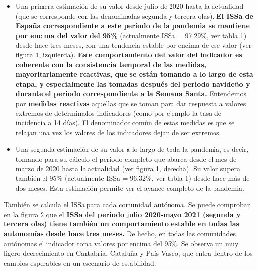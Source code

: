 \documentclass[
  11pt,
]{article}
\begin{document}
\begin{itemize}
\item
  Una primera estimación de su valor desde julio de 2020 hasta la
  actualidad (que se corresponde con las denominadas segunda y tercera
  olas). \textbf{El ISSa de España correspondiente a este periodo de la
  pandemia se mantiene por encima del valor del 95\%} (actualmente ISSa
  = 97.29\%, ver tabla 1) desde hace tres meses, con una tendencia
  estable por encima de ese valor (ver figura 1, izquierda).
  \textbf{Este comportamiento del valor del indicador es coherente con
  la consistencia temporal de las medidas, mayoritariamente reactivas,
  que se están tomando a lo largo de esta etapa, y especialmente las
  tomadas después del periodo navideño y durante el periodo
  correspondiente a la Semana Santa.} Entendemos por \textbf{medidas
  reactivas} aquellas que se toman para dar respuesta a valores extremos
  de determinados indicadores (como por ejemplo la tasa de incidencia a
  14 días). El denominador común de estas medidas es que se relajan una
  vez los valores de los indicadores dejan de ser extremos.
\item
  Una segunda estimación de su valor a lo largo de toda la pandemia, es
  decir, tomando para su cálculo el periodo completo que abarca desde el
  mes de marzo de 2020 hasta la actualidad (ver figura 1, derecha). Su
  valor supera también el 95\% (actualmente ISSa = 96.32\%, ver tabla 1)
  desde hace más de dos meses. Esta estimación permite ver el avance
  completo de la pandemia.
\end{itemize}

También se calcula el ISSa para cada comunidad autónoma. Se puede
comprobar en la figura 2 que el \textbf{ISSa del periodo julio 2020-mayo
2021 (segunda y tercera olas) tiene también un comportamiento estable en
todas las autonomías desde hace tres meses.} De hecho, en todas las
comunidades autónomas el indicador toma valores por encima del 95\%. Se
observa un muy ligero decrecimiento en Cantabria, Cataluña y País Vasco,
que entra dentro de los cambios esperables en un escenario de
estabilidad.
\end{document}

